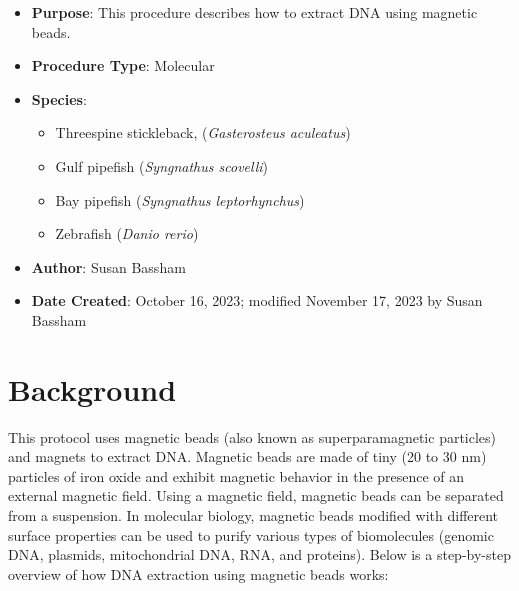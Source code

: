 \documentclass[
  letterpaper,
  DIV=11,
  numbers=noendperiod]{scrreprt}
\providecommand{\tightlist}{%
  \setlength{\itemsep}{0pt}\setlength{\parskip}{0pt}}\usepackage{longtable,booktabs,array}
\begin{document}
\begin{itemize}
\tightlist
\item
  \textbf{Purpose}: This procedure describes how to extract DNA using
  magnetic beads.
\item
  \textbf{Procedure Type}: Molecular
\item
  \textbf{Species}:

  \begin{itemize}
  \tightlist
  \item
    Threespine stickleback, (\emph{Gasterosteus aculeatus})
  \item
    Gulf pipefish (\emph{Syngnathus scovelli})
  \item
    Bay pipefish (\emph{Syngnathus leptorhynchus})
  \item
    Zebrafish (\emph{Danio rerio})
  \end{itemize}
\item
  \textbf{Author}: Susan Bassham
\item
  \textbf{Date Created}: October 16, 2023; modified November 17, 2023 by
  Susan Bassham
\end{itemize}

\hypertarget{background-1}{%
\section{Background}\label{background-1}}

This protocol uses magnetic beads (also known as superparamagnetic
particles) and magnets to extract DNA. Magnetic beads are made of tiny
(20 to 30 nm) particles of iron oxide and exhibit magnetic behavior in
the presence of an external magnetic field. Using a magnetic field,
magnetic beads can be separated from a suspension. In molecular biology,
magnetic beads modified with different surface properties can be used to
purify various types of biomolecules (genomic DNA, plasmids,
mitochondrial DNA, RNA, and proteins). Below is a step-by-step overview
of how DNA extraction using magnetic beads works:
\end{document}
